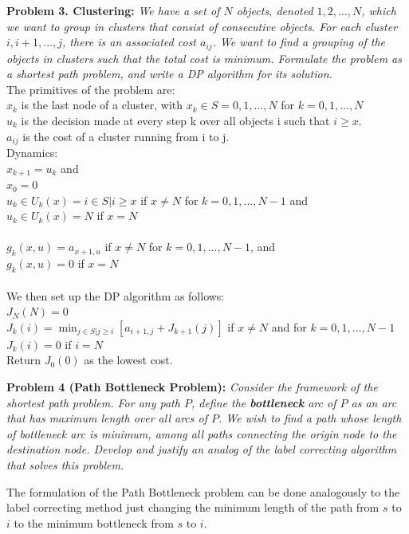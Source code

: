 \documentclass[11pt, english]{article}
\begin{document}
\textbf{Problem 3. Clustering:} \textit{We have a set of $N$ objects, denoted $1, 2, . . . , N$, which we want to group in clusters that consist of consecutive objects. For each cluster $i, i + 1, . . . , j$, there is an associated cost $a_{ij}$. We want to find a grouping of the objects in clusters such that the total cost is minimum. Formulate the problem as a shortest path problem, and write a DP algorithm for its solution.}\\

The primitives of the problem are:\\
$x_k$ is the last node of a cluster, with $x_k \in S = {0, 1, ..., N}$ for $k = 0, 1, ..., N$\\
$u_k$ is the decision made at every step k over all objects i such that $i \geq x$.\\
$a_{ij}$ is the cost of a cluster running from i to j.\\
Dynamics:\\
$x_{k+1} = u_k$ and\\
$x_0 = 0$\\
$u_k \in U_k(x) = {i \in S | i\geq x}$ if $x \neq N$ for $k = 0, 1, ..., N-1$ and\\
$u_k \in U_k(x) = {N}$ if $x= N$\\
\\
$g_k(x, u) = a_{x+1,u}$ if $x \neq N$ for $k = 0, 1, ..., N-1$, and \\
$g_k(x, u) = 0$ if $x = N$\\
\\
We then set up the DP algorithm as follows:\\
$J_N(N) = 0$\\
$J_k(i) = \displaystyle \min_{j \in S|j \geq i}[a_{i+1,j} + J_{k+1}(j)]$ if $x \neq N$ and for $k = 0, 1, ..., N-1$\\
$J_k(i) = 0$ if $i = N$\\
Return $J_0(0)$ as the lowest cost.\\
\newpage

\textbf{Problem 4 (Path Bottleneck Problem):}\textit{ Consider the framework of the shortest path problem. For any path $P$, define the \textbf{bottleneck} arc of $P$ as an arc that has maximum length over all arcs of $P$. We wish to find a path whose length of bottleneck arc is minimum, among all paths connecting the origin node to the destination node. Develop and justify an analog of the label correcting algorithm that solves this problem. }


The formulation of the Path Bottleneck problem can be done analogously to the label correcting method just changing the minimum length of the path from $s$ to $i$ to the minimum bottleneck from $s$ to $i$.\\
\end{document}
